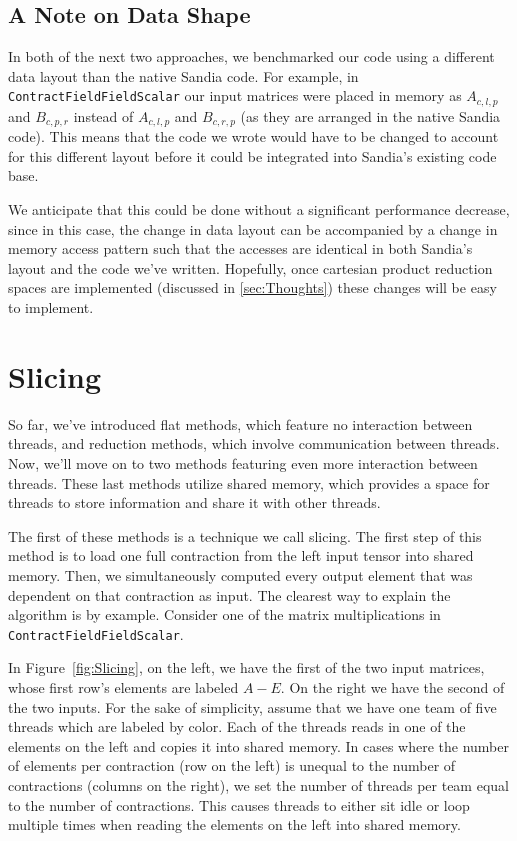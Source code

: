 \subsection{A Note on Data Shape} \label{sec:DataShape}
In both of the next two approaches, we benchmarked our code using a different data layout than the native
Sandia code. For example, in \texttt{ContractFieldFieldScalar} our input matrices were placed in memory as $A_{c,l,p}$ and
$B_{c,p,r}$ instead of $A_{c,l,p}$ and $B_{c,r,p}$ (as they are arranged in the native Sandia code).
This means that the code we wrote would have to be changed to account for this different layout
before it could be integrated into Sandia's existing code base. 

We anticipate that this could be done without a
significant performance decrease, since in this case, the change in data layout can be accompanied by a change in 
memory access pattern such that the accesses are identical in both Sandia's layout and the code we've written.
Hopefully, once cartesian product reduction spaces are implemented (discussed in \ref{sec:Thoughts}) these 
changes will be easy to implement. 
\section{Slicing} \label{sec:Slicing}
So far, we've introduced flat methods, which feature no interaction between threads, and reduction
methods, which involve communication between threads. Now, we'll move on to two methods
featuring even more interaction between threads. These last methods utilize shared memory, 
which provides a space for threads to store information and share it with other threads. 

The first of these methods is a technique we call slicing. The first
step of this method is to load one full contraction from the left input tensor into
shared memory. Then, we simultaneously computed every output element that was
dependent on that contraction as input. The clearest way to explain the
algorithm is by example. Consider one of the matrix multiplications in
\texttt{ContractFieldFieldScalar}. 

    In Figure~\ref{fig:Slicing}, on the left, we have the first of the two input matrices, whose first row's
elements are labeled $A-E$. On the right we have the second of the two inputs.
For the sake of simplicity, assume that we have one team of five threads which
are labeled by color. Each of the threads reads in one of the elements on the
left and copies it into shared memory. In cases where the number of elements
per contraction (row on the left) is unequal to the number of contractions
(columns on the right), we set the number of threads per team equal to the
number of contractions. This causes threads to either sit idle or loop multiple
times when reading the elements on the left into shared memory.
	
